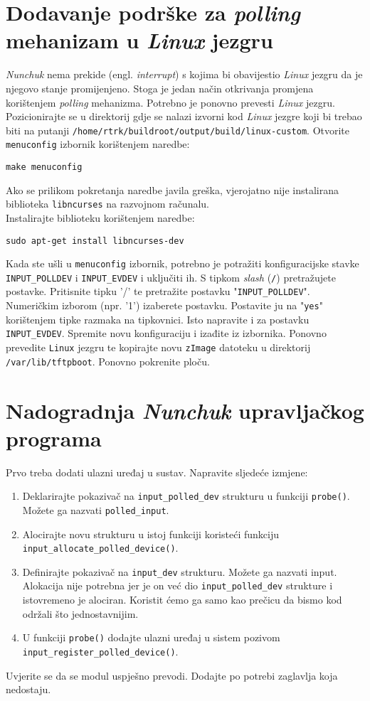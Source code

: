 \documentclass[11pt]{article}
\begin{document}
\section{Dodavanje podrške za \textit{polling} mehanizam u \textit{Linux} jezgru}
\textit{Nunchuk} nema prekide (engl. \textit{interrupt}) s kojima bi obavijestio
\textit{Linux} jezgru da je njegovo stanje promijenjeno. Stoga je jedan način
otkrivanja promjena korištenjem \textit{polling} mehanizma.
\newline
\newline
Potrebno je ponovno prevesti \textit{Linux} jezgru. Pozicionirajte se u
direktorij gdje se nalazi izvorni kod \textit{Linux} jezgre koji bi trebao biti
na putanji \texttt{/home/rtrk/buildroot/output/build/linux-custom}.
Otvorite \texttt{menuconfig} izbornik korištenjem naredbe:
\begin{lstlisting}
make menuconfig
\end{lstlisting}
Ako se prilikom pokretanja naredbe javila greška, vjerojatno nije instalirana
biblioteka \texttt{libncurses} na razvojnom računalu.\\
Instalirajte biblioteku korištenjem naredbe:
\begin{lstlisting}
sudo apt-get install libncurses-dev
\end{lstlisting}
Kada ste ušli u \texttt{menuconfig} izbornik, potrebno je potražiti
konfiguracijske stavke \texttt{INPUT\_POLLDEV} i \texttt{INPUT\_EVDEV} i
uključiti ih. S tipkom \textit{slash} (\texttt{/}) pretražujete postavke.
Pritisnite tipku '/' te pretražite postavku "\texttt{INPUT\_POLLDEV}".
Numeričkim izborom (npr. '1') izaberete postavku. Postavite ju na "\texttt{yes}"
korištenjem tipke razmaka na tipkovnici. Isto napravite i za postavku
\texttt{INPUT\_EVDEV}. Spremite novu konfiguraciju i izađite iz izbornika.
Ponovno prevedite \texttt{Linux} jezgru te kopirajte novu \texttt{zImage}
datoteku u direktorij \texttt{/var/lib/tftpboot}. Ponovno pokrenite ploču.

\section{Nadogradnja \textit{Nunchuk} upravljačkog programa}
Prvo treba dodati ulazni uređaj u sustav. Napravite sljedeće izmjene:
\begin{enumerate}
	\item Deklarirajte pokazivač na \texttt{input\_polled\_dev} strukturu u
		funkciji \texttt{probe()}. Možete ga nazvati \texttt{polled\_input}.
	\item Alocirajte novu strukturu u istoj funkciji koristeći funkciju
		\texttt{input\_allocate\_polled\_device()}.
	\item Definirajte pokazivač na \texttt{input\_dev} strukturu. Možete ga
		nazvati input. Alokacija nije potrebna jer je on već dio
		\texttt{input\_polled\_dev} strukture i istovremeno je alociran.
		Koristit ćemo ga samo kao prečicu da bismo kod održali što
		jednostavnijim.
	\item U funkciji \texttt{probe()} dodajte ulazni uređaj u sistem pozivom
		\texttt{input\_register\_polled\_device()}.
\end{enumerate}
Uvjerite se da se modul uspješno prevodi. Dodajte po potrebi zaglavlja koja
nedostaju.
\end{document}
